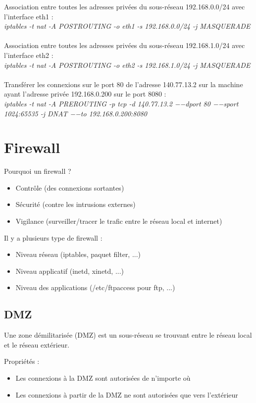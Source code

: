 \documentclass[journal, a4paper]{IEEEtran}
\begin{document}
Association entre toutes les adresses privées du sous-réseau 192.168.0.0/24 avec l’interface eth1 :\\
\textit{iptables -t nat -A POSTROUTING -o eth1 -s 192.168.0.0/24 -j MASQUERADE}\\
~\\
Association entre toutes les adresses privées du sous-réseau 192.168.1.0/24 avec l’interface eth2 :\\
\textit{iptables -t nat -A POSTROUTING -o eth2 -s 192.168.1.0/24 -j MASQUERADE}\\
~\\
Transférer les connexions sur le port 80 de l’adresse 140.77.13.2 sur la machine ayant l’adresse privée 192.168.0.200 sur le port 8080 :\\
\textit{iptables -t nat -A PREROUTING -p tcp -d 140.77.13.2 −−dport 80 −−sport 1024:65535 -j DNAT −−to 192.168.0.200:8080}


\newpage
\section{Firewall}

Pourquoi un firewall ?
\begin{itemize}
	\item Contrôle (des connexions sortantes)
	\item Sécurité (contre les intrusions externes)
	\item Vigilance (surveiller/tracer le trafic entre le réseau local et internet)
\end{itemize}

Il y a plusieurs type de firewall :
\begin{itemize}
	\item Niveau réseau (iptables, paquet filter, ...)
	\item Niveau applicatif (inetd, xinetd, ...)
	\item Niveau des applications (/etc/ftpaccess pour ftp, ...)
\end{itemize}

\subsection{DMZ}

Une zone démilitarisée (DMZ) est un sous-réseau se trouvant entre le réseau local et le réseau extérieur.

Propriétés :
\begin{itemize}
	\item Les connexions à la DMZ sont autorisées de n’importe où
	\item Les connexions à partir de la DMZ ne sont autorisées que vers l’extérieur
\end{itemize}
\end{document}
